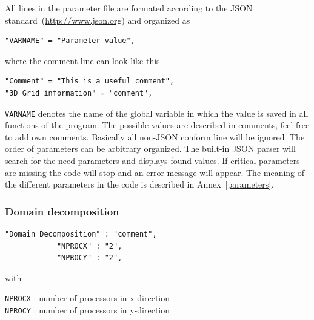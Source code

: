 All lines in the parameter file are formated according to the JSON standard~(\url{http://www.json.org}) and organized as 
\begin{verbatim}
"VARNAME" = "Parameter value",
\end{verbatim}

where the comment line can look like this

\begin{verbatim}
"Comment" = "This is a useful comment",
"3D Grid information" = "comment",
\end{verbatim}

\texttt{VARNAME} denotes the name of the global variable in which the value is saved in all functions of the program. The possible values are described in comments, feel free to add own comments. Basically all non-JSON conform line will be ignored. The order of parameters can be arbitrary organized. The built-in JSON parser will search for the need parameters and displays found values. If critical parameters are missing the code will stop and an error message will appear. The meaning of the different parameters in the code is described in Annex~\ref{parameters}.

\subsubsection{Domain decomposition}
\begin{verbatim}
"Domain Decomposition" : "comment",
            "NPROCX" : "2",
            "NPROCY" : "2",
\end{verbatim}

with

\texttt{NPROCX} : number of processors in x-direction\\
\texttt{NPROCY} : number of processors in y-direction

